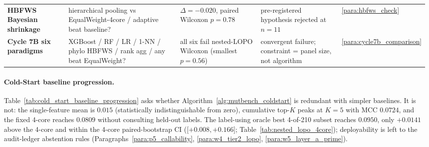 \begin{table}[htbp]
\begin{tabular}{p{}p{}p{}p{}p{}}
\textbf{HBFWS Bayesian shrinkage} & hierarchical pooling vs EqualWeight-4core / adaptive beat baseline? & $\Delta = -0.020$, paired Wilcoxon $p=0.78$ & pre-registered hypothesis rejected at $n=11$ & \ref{para:hbfws_check} \\
\textbf{Cycle 7B six paradigms} & XGBoost / RF / LR / 1-NN / phylo HBFWS / rank agg / any beat EqualWeight? & all six fail nested-LOPO Wilcoxon (smallest $p=0.56$) & convergent failure; constraint = panel size, not algorithm & \ref{para:cycle7b_comparison} \\
\bottomrule
\end{tabular}
\end{table}

\paragraph{Cold-Start baseline progression.}
\label{para:cold_start_baseline_progression}
Table~\ref{tab:cold_start_baseline_progression} asks whether Algorithm~\ref{alg:mutbench_coldstart} is redundant with simpler baselines. It is not: the single-feature mean is $0.015$ (statistically indistinguishable from zero), cumulative top-$K$ peaks at $K=5$ with MCC $0.0724$, and the fixed 4-core reaches $0.0809$ without consulting held-out labels. The label-using oracle best 4-of-210 subset reaches $0.0950$, only $+0.0141$ above the 4-core and within the 4-core paired-bootstrap CI ([$+0.008, +0.166$]; Table~\ref{tab:nested_lopo_4core}); deployability is left to the audit-ledger abstention rules (Paragraphs~\ref{para:p5_callability}, \ref{para:w4_tier2_lopo}, \ref{para:w5_layer_a_prime}).

